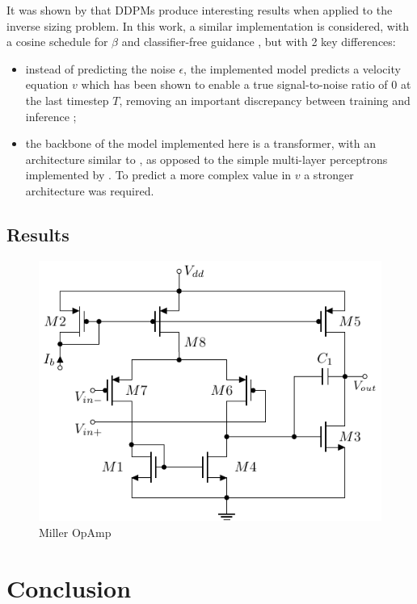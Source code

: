 \documentclass[conference]{IEEEtran}
\begin{document}
	It was shown by \cite{eid24diffusion} that DDPMs produce interesting results when applied to the inverse sizing problem. In this work, a similar implementation is considered, with a cosine schedule for $\beta$ and classifier-free guidance \cite{ho2022classifierfreediffusionguidance}, but with 2 key differences:
	
	\begin{itemize}
		\item instead of predicting the noise $\epsilon$, the implemented model predicts a velocity equation $v$ which has been shown to enable a true signal-to-noise ratio of $0$ at the last timestep $T$, removing an important discrepancy between training and inference \cite{lin2024commondiffusionnoiseschedules};
		\item the backbone of the model implemented here is a transformer, with an architecture similar to \cite{peebles2023scalablediffusionmodelstransformers}, as opposed to the simple multi-layer perceptrons implemented by \cite{eid24diffusion}. To predict a more complex value in $v$ a stronger architecture was required.
	\end{itemize}
	
	\subsection{Results}
	\begin{figure}[]
		\centering
		\includegraphics[width=.7\linewidth]{figures/miller_pmos}
		\caption{Miller OpAmp}
		\label{fig:miller}
	\end{figure}
	
	
\section{Conclusion}
	



\end{document}
